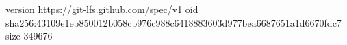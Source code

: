 version https://git-lfs.github.com/spec/v1
oid sha256:43109e1eb850012b058cb976c988c6418883603d977bea6687651a1d6670fdc7
size 349676

